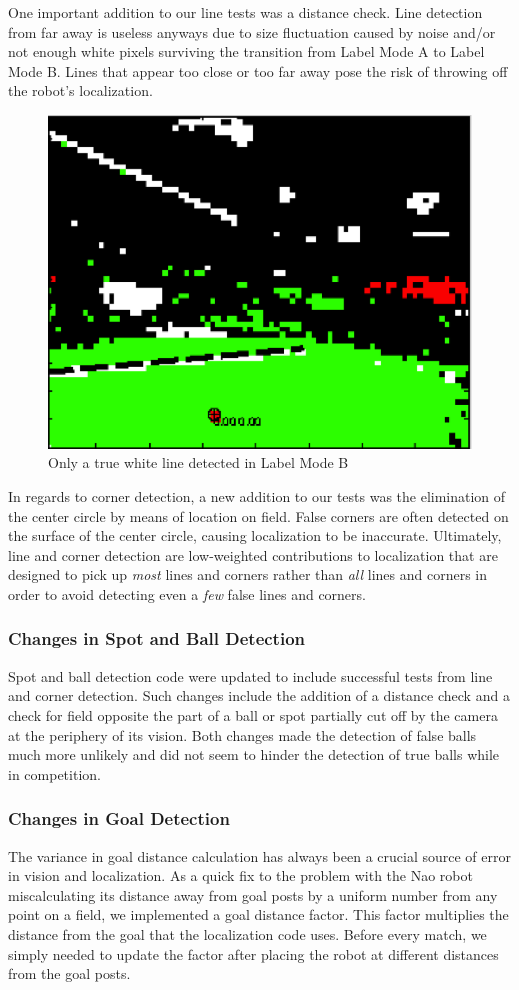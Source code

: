 \documentclass{article}
\begin{document}
	    One important addition to our line tests was a distance check. Line detection from far away is useless anyways due to size fluctuation caused by noise and/or not enough white pixels surviving the transition from Label Mode A to Label Mode B. Lines that appear too close or too far away pose the risk of throwing off the robot's localization.
      \begin{figure}[H]
		    \centering
    		\includegraphics[width=.6\textwidth]{figures/BLineDetect.eps}
		    \caption{Only a true white line detected in Label Mode B}
		    \label{fig:linedetect}
    	\end{figure}
	
      In regards to corner detection, a new addition to our tests was the elimination of the center circle by means of location on field. False corners are often detected on the surface of the center circle, causing localization to be inaccurate. Ultimately, line and corner detection are low-weighted contributions to localization that are designed to pick up \textit{most} lines and corners rather than \textit{all} lines and corners in order to avoid detecting even a \textit{few} false lines and corners.

    \subsubsection{Changes in Spot and Ball Detection}
      Spot and ball detection code were updated to include successful tests from line and corner detection. Such changes include the addition of a distance check and a check for field opposite the part of a ball or spot partially cut off by the camera at the periphery of its vision. Both changes made the detection of false balls much more unlikely and did not seem to hinder the detection of true balls while in competition.

    \subsubsection{Changes in Goal Detection}
      The variance in goal distance calculation has always been a crucial source of error in vision and localization. As a quick fix to the problem with the Nao robot miscalculating its distance away from goal posts by a uniform number from any point on a field, we implemented a goal distance factor. This factor multiplies the distance from the goal that the localization code uses. Before every match, we simply needed to update the factor after placing the robot at different distances from the goal posts.
\end{document}
